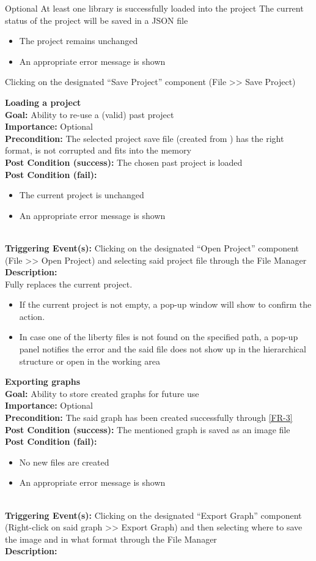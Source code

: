 \documentclass[10pt,a4paper]{report}
\newcommand{\precondition}[1]{
    \textbf{Precondition: } #1 \leavevmode \\
}
\newcommand{\FRODescription}[8]{
    \textbf{#1} \leavevmode \\
    \textbf{Goal: } #2 \leavevmode \\
    \textbf{Importance: } #3 \leavevmode \\
    \precondition{#4}
    \textbf{Post Condition (success): } #5 \leavevmode \\
    \textbf{Post Condition (fail): } #6 \leavevmode \\
    \textbf{Triggering Event(s): } #7 \leavevmode \\
    \textbf{Description: } \leavevmode \\
    #8}
\begin{document}
\begin{FRO}
    {Optional}
    {At least one library is successfully loaded into the project}
    {The current status of the project will be saved in a JSON file}
    {\begin{itemize}
        \item The project remains unchanged
        \item An appropriate error message is shown
    \end{itemize}}
    {Clicking on the designated “Save Project” component (File >> Save Project)}
    \item \FRODescription{Loading a project}
    {Ability to re-use a (valid) past project}
    {Optional}
    {The selected project save file (created from \label{FRO-PREVIOUS}) has the right format, is not corrupted and fits into the memory}
    {The chosen past project is loaded}
    {\begin{itemize}
        \item The current project is unchanged
        \item An appropriate error message is shown
    \end{itemize}}
    {Clicking on the designated “Open Project” component (File >> Open Project) and selecting said project file through the File Manager}
    {Fully replaces the current project. 
    \begin{itemize}
    \item If the current project is not empty, a pop-up window will show to confirm the action. 
    \item In case one of the liberty files is not found on the specified path, a pop-up panel notifies the error and the said file does not show up in the hierarchical structure or open in the working area
    \end{itemize}}
    \item \FRODescription{Exporting graphs}
    {Ability to store created graphs for future use}
    {Optional}
    {The said graph has been created successfully through \ref{FR-3}}
    {The mentioned graph is saved as an image file}
    {\begin{itemize}
        \item No new files are created
        \item An appropriate error message is shown
    \end{itemize}}
    {Clicking on the designated “Export Graph” component (Right-click on said graph >> Export Graph) and then selecting where to save the image and in what format through the File Manager}
    \item {}

\end{FRO}
\end{document}
